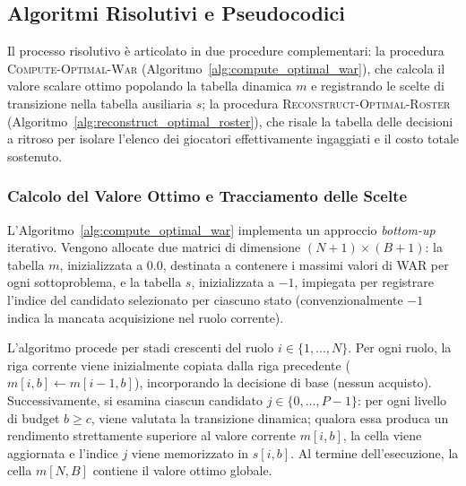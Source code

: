 \subsection{Algoritmi Risolutivi e Pseudocodici}
Il processo risolutivo è articolato in due procedure complementari:
la procedura \textsc{Compute-Optimal-War} (Algoritmo~\ref{alg:compute_optimal_war}), che calcola il valore scalare ottimo popolando la tabella dinamica $m$ e registrando le scelte di transizione nella tabella ausiliaria $s$;
la procedura \textsc{Reconstruct-Optimal-Roster} (Algoritmo~\ref{alg:reconstruct_optimal_roster}), che risale la tabella delle decisioni a ritroso per isolare l'elenco dei giocatori effettivamente ingaggiati e il costo totale sostenuto.

\subsubsection{Calcolo del Valore Ottimo e Tracciamento delle Scelte}
L'Algoritmo~\ref{alg:compute_optimal_war} implementa un approccio \textit{bottom-up} iterativo. Vengono allocate due matrici di dimensione $(N + 1) \times (B + 1)$: la tabella $m$, inizializzata a $0.0$, destinata a contenere i massimi valori di WAR per ogni sottoproblema, e la tabella $s$, inizializzata a $-1$, impiegata per registrare l'indice del candidato selezionato per ciascuno stato (convenzionalmente $-1$ indica la mancata acquisizione nel ruolo corrente).

L'algoritmo procede per stadi crescenti del ruolo $i \in \{1, \dots, N\}$. Per ogni ruolo, la riga corrente viene inizialmente copiata dalla riga precedente ($m[i, b] \gets m[i-1, b]$), incorporando la decisione di base (nessun acquisto). Successivamente, si esamina ciascun candidato $j \in \{0, \dots, P - 1\}$: per ogni livello di budget $b \ge c$, viene valutata la transizione dinamica; qualora essa produca un rendimento strettamente superiore al valore corrente $m[i, b]$, la cella viene aggiornata e l'indice $j$ viene memorizzato in $s[i, b]$. Al termine dell'esecuzione, la cella $m[N, B]$ contiene il valore ottimo globale.

